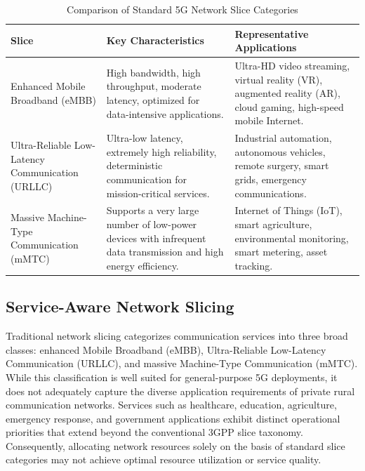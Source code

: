\documentclass[12pt,a4paper]{report}
\begin{document}
	\begin{table}[H]
		\centering
		\caption{Comparison of Standard 5G Network Slice Categories}
		\label{tab:slices}
		
		\begin{tabular}{|p{2.5cm}|p{5.5cm}|p{6cm}|}
			\hline
			
			\textbf{Slice} &
			\textbf{Key Characteristics} &
			\textbf{Representative Applications}
			\\
			\hline
			
			Enhanced Mobile Broadband (eMBB) &
			High bandwidth, high throughput, moderate latency, optimized for data-intensive applications. &
			Ultra-HD video streaming, virtual reality (VR), augmented reality (AR), cloud gaming, high-speed mobile Internet.
			\\
			\hline
			
			Ultra-Reliable Low-Latency Communication (URLLC) &
			Ultra-low latency, extremely high reliability, deterministic communication for mission-critical services. &
			Industrial automation, autonomous vehicles, remote surgery, smart grids, emergency communications.
			\\
			\hline
			
			Massive Machine-Type Communication (mMTC) &
			Supports a very large number of low-power devices with infrequent data transmission and high energy efficiency. &
			Internet of Things (IoT), smart agriculture, environmental monitoring, smart metering, asset tracking.
			\\
			\hline
			
		\end{tabular}
		
	\end{table}
	
	\subsection{Service-Aware Network Slicing}
	
	Traditional network slicing categorizes communication services into three broad classes: enhanced Mobile Broadband (eMBB), Ultra-Reliable Low-Latency Communication (URLLC), and massive Machine-Type Communication (mMTC). While this classification is well suited for general-purpose 5G deployments, it does not adequately capture the diverse application requirements of private rural communication networks. Services such as healthcare, education, agriculture, emergency response, and government applications exhibit distinct operational priorities that extend beyond the conventional 3GPP slice taxonomy. Consequently, allocating network resources solely on the basis of standard slice categories may not achieve optimal resource utilization or service quality.
	
\end{document}
